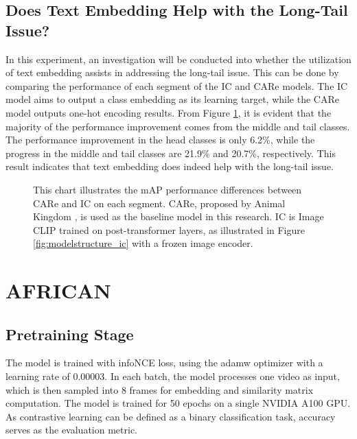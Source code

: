 \subsection{Does Text Embedding Help with the Long-Tail Issue?}
In this experiment, an investigation will be conducted into whether the utilization of text embedding assists in addressing the long-tail issue. This can be done by comparing the performance of each segment of the IC and CARe models. The IC model aims to output a class embedding as its learning target, while the CARe model outputs one-hot encoding results. From Figure \ref{fig:tp_longtailcomp}, it is evident that the majority of the performance improvement comes from the middle and tail classes. The performance improvement in the head classes is only 6.2\%, while the progress in the middle and tail classes are 21.9\% and 20.7\%, respectively. This result indicates that text embedding does indeed help with the long-tail issue. 

\begin{figure}[ht]
    \centering
    \resizebox{0.75\textwidth}{!}{}
    \caption[mAP Performance Differences between CARe and IC on each Segment]{This chart illustrates the mAP performance differences between CARe and IC on each segment. CARe, proposed by Animal Kingdom \parencite{ng2022animal}, is used as the baseline model in this research. IC is Image CLIP trained on post-transformer layers, as illustrated in Figure \ref{fig:modelstructure_ic} with a frozen image encoder.}
    \label{fig:tp_longtailcomp}
\end{figure}



\section{AFRICAN}
\subsection{Pretraining Stage}
The model is trained with infoNCE \parencite{oord2019representation} loss, using the adamw optimizer with a learning rate of 0.00003. In each batch, the model processes one video as input, which is then sampled into 8 frames for embedding and similarity matrix computation. The model is trained for 50 epochs on a single NVIDIA A100 GPU. As contrastive learning can be defined as a binary classification task, accuracy serves as the evaluation metric.

